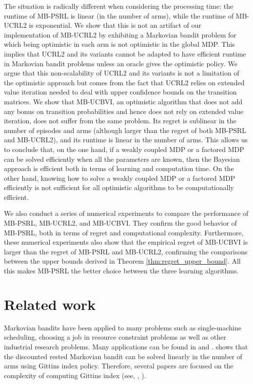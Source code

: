 The situation is radically different when considering the processing time: the runtime of MB-PSRL is linear (in the number of arms), while the runtime of MB-UCRL2 is exponential. We show that this is not an artifact of our implementation of MB-UCRL2 by exhibiting a Markovian bandit problem for which being optimistic in each arm is not optimistic in the global MDP. This implies that UCRL2 and its variants \cite{bourel2020tightening,fruit2018efficient,talebi2018variance,filippi2010optimism} cannot be adapted to have efficient runtime in Markovian bandit problems unless an oracle gives the optimistic policy. We argue that this non-scalability of UCRL2 and its variants is not a limitation  of the optimistic approach but comes from the fact that UCRL2 relies on  extended value iteration \cite{jaksch2010near} needed to deal with  upper confidence bounds on the transition matrices.  We show that MB-UCBVI, an optimistic algorithm that does not add any bonus on transition probabilities and hence does not rely on extended value iteration,  does not suffer from the same problem. Its  regret is  sublinear in the number of episodes and arms (although larger than the regret of both MB-PSRL and MB-UCRL2), and its  runtime is linear in the number of arms.
This allows us to conclude that, on the one hand, if a weakly coupled MDP or a factored MDP can be solved efficiently when all the parameters are known, then the Bayesian approach is efficient both in terms of learning and computation time. On the other hand, knowing how to solve a weakly coupled MDP or a factored MDP efficiently is not sufficient for all optimistic algorithms to be computationally efficient.

We also conduct a series of numerical experiments to compare the performance of MB-PSRL,  MB-UCRL2, and MB-UCBVI.  They confirm the good behavior of MB-PSRL, both in terms of regret and computational complexity. Furthermore, these numerical experiments also show that the empirical regret of MB-UCBVI is larger than the regret of MB-PSRL and MB-UCRL2, confirming the comparisons between the upper bounds derived in Theorem \ref{thm:regret_upper_bound}. All this  makes MB-PSRL the better choice between the three learning algorithms.

\section{Related work}
\label{ch:rested:related}

Markovian bandits have been applied to many problems such as single-machine scheduling, choosing a job in  resource constraint problems  as well as other  industrial research problems. Many applications can be found in \cite[Section 3.6]{puterman2014markov} and \cite{gittins2011multi}. \cite{gittins1979bandit} shows that the discounted rested Markovian bandit can be solved linearly in the number of arms using Gittins index policy. Therefore, several papers are   focused  on the complexity of  computing  Gittins index (see, \eg, \cite{gast2022computing, chakravorty2014multi}).

